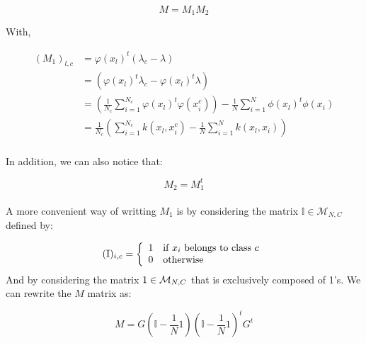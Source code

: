 $$ M = M_1M_2 $$

With,

\begin{align*}
(M_1)_{l, c} &= \varphi(x_l)^t(\lambda_c - \lambda)\\
             &= (\varphi(x_l)^t\lambda_c -\varphi(x_l)^t\lambda) \\
             &= \left( \frac{1}{N_c} \sum_{i=1}^{N_c} \varphi(x_l)^t\varphi(x_i^c)\right) -
                 \frac{1}{N}\sum_{i=1}^N\phi(x_l)^t\phi(x_i) \\
             &= \frac{1}{N_c} \left(\sum_{i = 1}^{N_c} k(x_l, x_i^c) -
                \frac{1}{N}\sum_{i=1}^N k(x_l, x_i) \right)\\
\end{align*}

In addition, we can also notice that:

$$ M_2 = M_1^t $$

\paragraph{}
A more convenient way of writting $M_1$ is by considering the matrix $\mathbb{I} \in
\mathcal{M}_{N,C}$ defined by:

$$ (\mathbb{I})_{i, c} = \left\{ \begin{array}{ll}
                                  1 & \textnormal{if $x_i$ belongs to class $c$} \\
                                  0 & \textnormal{otherwise}
                               \end{array}
                        \right.$$
And by considering the matrix ${\Huge 1} \in \mathcal{M}_{N,C}$ that is exclusively composed of
1's.
We can rewrite the $M$ matrix as:

$$M = G\left( \mathbb{I} - \frac{1}{N} 1\right)\left( \mathbb{I} - \frac{1}{N} 1\right)^tG^t$$

